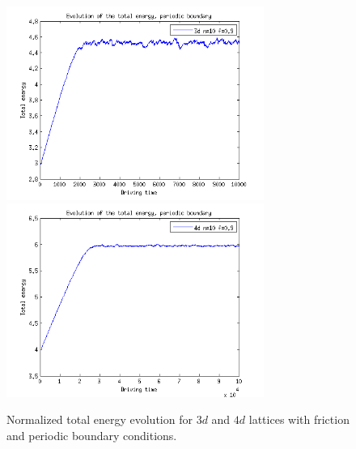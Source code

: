 \begin{figure}
\begin{center}
\includegraphics[width=0.75\textwidth]{results/3ep.png}
\includegraphics[width=0.75\textwidth]{results/4ep.png}
\caption{Normalized total energy evolution for $3d$ and $4d$ lattices with friction and periodic boundary conditions. }
\label{ep}
\end{center}
\end{figure}


